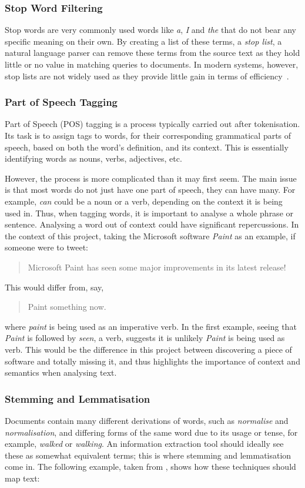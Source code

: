 \subsubsection{Stop Word Filtering}
Stop words are very commonly used words like \emph{a}, \emph{I} and \emph{the} that do not bear any specific meaning on their own. By creating a list of these terms, a \emph{stop list}, a natural language parser can remove these terms from the source text as they hold little or no value in matching queries to documents. In modern systems, however, stop lists are not widely used as they provide little gain in terms of efficiency~\cite{manning2008}.

\subsubsection{Part of Speech Tagging}
Part of Speech (POS) tagging is a process typically carried out after tokenisation. Its task is to assign tags to words, for their corresponding grammatical parts of speech, based on both the word's definition, and its context. This is essentially identifying words as nouns, verbs, adjectives, etc.

However, the process is more complicated than it may first seem. The main issue is that most words do not just have one part of speech, they can have many. For example, \emph{can} could be a noun or a verb, depending on the context it is being used in. Thus, when tagging words, it is important to analyse a whole phrase or sentence. Analysing a word out of context could have significant repercussions. In the context of this project, taking the Microsoft software \emph{Paint} as an example, if someone were to tweet:
\begin{quote}
Microsoft Paint has seen some major improvements in its latest release!
\end{quote}
This would differ from, say,
\begin{quote}
Paint something now.
\end{quote}
where \emph{paint} is being used as an imperative verb. In the first example, seeing that \emph{Paint} is followed by \emph{seen}, a verb, suggests it is unlikely \emph{Paint} is being used as verb.  This would be the difference in this project between discovering a piece of software and totally missing it, and thus highlights the importance of context and semantics when analysing text.

\subsubsection{Stemming and Lemmatisation}
Documents contain many different derivations of words, such as \emph{normalise} and \emph{normalisation}, and differing forms of the same word due to its usage or tense, for example, \emph{walked} or \emph{walking}. An information extraction tool should ideally see these as somewhat equivalent terms; this is where stemming and lemmatisation come in. The following example, taken from \cite{manning2008}, shows how these techniques should map text:

